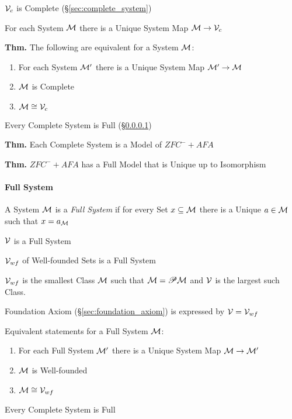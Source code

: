 $\mathcal{V}_c$ is Complete (\S\ref{sec:complete_system})

For each System $\mathcal{M}$ there is a Unique System Map $\mathcal{M}
\rightarrow \mathcal{V}_c$

\textbf{Thm.} The following are equivalent for a System $\mathcal{M}$:
\begin{enumerate}
  \item For each System $\mathcal{M}'$ there is a Unique System Map
    $\mathcal{M}' \rightarrow \mathcal{M}$
  \item $\mathcal{M}$ is Complete
  \item $\mathcal{M} \cong \mathcal{V}_c$
\end{enumerate}

Every Complete System is Full (\S\ref{sec:full_system})

\textbf{Thm.} Each Complete System is a Model of $ZFC^- + AFA$

\textbf{Thm.} $ZFC^- + AFA$ has a Full Model that is Unique up to
Isomorphism



\paragraph{Full System}\label{sec:full_system}\hfill

A System $\mathcal{M}$ is a \emph{Full System} if for every Set $x
\subseteq \mathcal{M}$ there is a Unique $a \in \mathcal{M}$ such that $x
= a_\mathcal{M}$

$\mathcal{V}$ is a Full System

$\mathcal{V}_{wf}$ of Well-founded Sets is a Full System

$\mathcal{V}_{wf}$ is the smallest Class $\mathcal{M}$ such that
$\mathcal{M} = \mathscr{P}\mathcal{M}$ and $\mathcal{V}$ is the largest such Class.

Foundation Axiom (\S\ref{sec:foundation_axiom}) is expressed by
$\mathcal{V} = \mathcal{V}_{wf}$

Equivalent statements for a Full System $\mathcal{M}$:
\begin{enumerate}
  \item For each Full System $\mathcal{M}'$ there is a Unique System Map
    $\mathcal{M} \rightarrow \mathcal{M}'$
  \item $\mathcal{M}$ is Well-founded
  \item $\mathcal{M} \cong \mathcal{V}_{wf}$
\end{enumerate}

Every Complete System is Full



